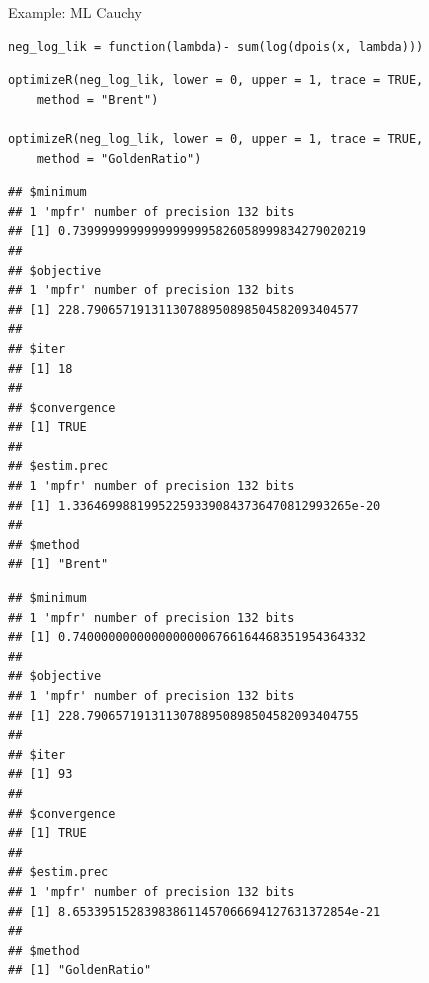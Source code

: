 \begin{vbframe}{Example: ML Cauchy}
\begin{verbatim}
neg_log_lik = function(lambda)- sum(log(dpois(x, lambda)))
\end{verbatim}

\vspace{0.2cm}

\begin{verbatim}
optimizeR(neg_log_lik, lower = 0, upper = 1, trace = TRUE, 
	method = "Brent")

optimizeR(neg_log_lik, lower = 0, upper = 1, trace = TRUE, 
	method = "GoldenRatio")

\end{verbatim}







\framebreak 





\begin{verbatim}
## $minimum
## 1 'mpfr' number of precision 132 bits
## [1] 0.73999999999999999995826058999834279020219
##
## $objective
## 1 'mpfr' number of precision 132 bits
## [1] 228.79065719131130788950898504582093404577
##
## $iter
## [1] 18
##
## $convergence
## [1] TRUE
##
## $estim.prec
## 1 'mpfr' number of precision 132 bits
## [1] 1.336469988199522593390843736470812993265e-20
##
## $method
## [1] "Brent"
\end{verbatim}

\framebreak

\begin{verbatim}
## $minimum
## 1 'mpfr' number of precision 132 bits
## [1] 0.74000000000000000006766164468351954364332
##
## $objective
## 1 'mpfr' number of precision 132 bits
## [1] 228.79065719131130788950898504582093404755
##
## $iter
## [1] 93
##
## $convergence
## [1] TRUE
##
## $estim.prec
## 1 'mpfr' number of precision 132 bits
## [1] 8.653395152839838611457066694127631372854e-21
##
## $method
## [1] "GoldenRatio"
\end{verbatim}

\end{vbframe}

